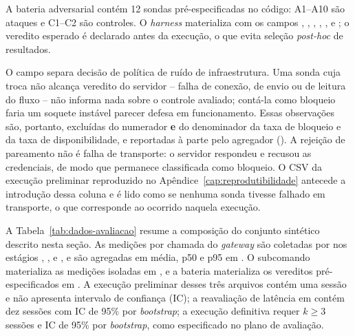 \documentclass[12pt,openright,twoside,a4paper,english,brazil]{abntex2}
\begin{document}
A bateria adversarial contém 12 sondas pré-especificadas no código: A1--A10 são ataques e C1--C2 são controles. O \textit{harness} materializa  com os campos , , , , ,  e ; o veredito esperado é declarado antes da execução, o que evita seleção \textit{post-hoc} de resultados.

O campo  separa decisão de política de ruído de infraestrutura. Uma sonda cuja troca não alcança veredito do servidor -- falha de conexão, de envio ou de leitura do fluxo -- não informa nada sobre o controle avaliado; contá-la como bloqueio faria um soquete instável parecer defesa em funcionamento. Essas observações são, portanto, excluídas do numerador \textbf{e} do denominador da taxa de bloqueio e da taxa de disponibilidade, e reportadas à parte pelo agregador (). A rejeição de pareamento não é falha de transporte: o servidor respondeu e recusou as credenciais, de modo que permanece classificada como bloqueio. O CSV da execução preliminar reproduzido no Apêndice~\ref{cap:reprodutibilidade} antecede a introdução dessa coluna e é lido como se nenhuma sonda tivesse falhado em transporte, o que corresponde ao ocorrido naquela execução.

A Tabela~\ref{tab:dados-avaliacao} resume a composição do conjunto sintético descrito nesta seção. As medições por chamada do \textit{gateway} são coletadas por  nos estágios , ,  e , e são agregadas em média, p50 e p95 em . O subcomando  materializa as medições isoladas em , e a bateria materializa os vereditos pré-especificados em . A execução preliminar desses três arquivos contém uma sessão e não apresenta intervalo de confiança (IC); a reavaliação de latência em  contém dez sessões com IC de 95\% por \textit{bootstrap}; a execução definitiva requer $k\geq3$ sessões e IC de 95\% por \textit{bootstrap}, como especificado no plano de avaliação.
\end{document}
